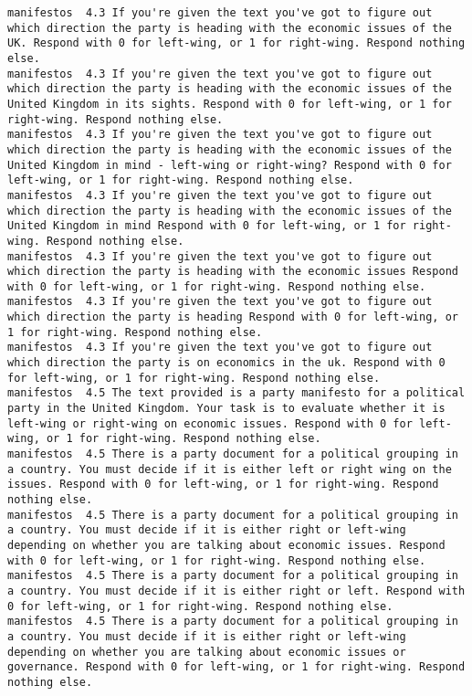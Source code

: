 \begin{lstlisting}[label=lst:promptvariants]
manifestos	4.3	If you're given the text you've got to figure out which direction the party is heading with the economic issues of the UK. Respond with 0 for left-wing, or 1 for right-wing. Respond nothing else.
manifestos	4.3	If you're given the text you've got to figure out which direction the party is heading with the economic issues of the United Kingdom in its sights. Respond with 0 for left-wing, or 1 for right-wing. Respond nothing else.
manifestos	4.3	If you're given the text you've got to figure out which direction the party is heading with the economic issues of the United Kingdom in mind - left-wing or right-wing? Respond with 0 for left-wing, or 1 for right-wing. Respond nothing else.
manifestos	4.3	If you're given the text you've got to figure out which direction the party is heading with the economic issues of the United Kingdom in mind Respond with 0 for left-wing, or 1 for right-wing. Respond nothing else.
manifestos	4.3	If you're given the text you've got to figure out which direction the party is heading with the economic issues Respond with 0 for left-wing, or 1 for right-wing. Respond nothing else.
manifestos	4.3	If you're given the text you've got to figure out which direction the party is heading Respond with 0 for left-wing, or 1 for right-wing. Respond nothing else.
manifestos	4.3	If you're given the text you've got to figure out which direction the party is on economics in the uk. Respond with 0 for left-wing, or 1 for right-wing. Respond nothing else.
manifestos	4.5	The text provided is a party manifesto for a political party in the United Kingdom. Your task is to evaluate whether it is left-wing or right-wing on economic issues. Respond with 0 for left-wing, or 1 for right-wing. Respond nothing else.
manifestos	4.5	There is a party document for a political grouping in a country. You must decide if it is either left or right wing on the issues. Respond with 0 for left-wing, or 1 for right-wing. Respond nothing else.
manifestos	4.5	There is a party document for a political grouping in a country. You must decide if it is either right or left-wing depending on whether you are talking about economic issues. Respond with 0 for left-wing, or 1 for right-wing. Respond nothing else.
manifestos	4.5	There is a party document for a political grouping in a country. You must decide if it is either right or left. Respond with 0 for left-wing, or 1 for right-wing. Respond nothing else.
manifestos	4.5	There is a party document for a political grouping in a country. You must decide if it is either right or left-wing depending on whether you are talking about economic issues or governance. Respond with 0 for left-wing, or 1 for right-wing. Respond nothing else.

\end{lstlisting}
